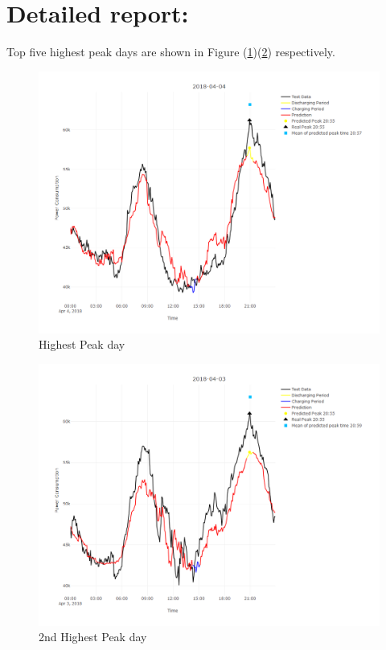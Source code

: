 \documentclass[
]{article}
\begin{document}
\hypertarget{detailed-report}{%
\section{Detailed report:}\label{detailed-report}}

Top five highest peak days are shown in Figure
(\ref{fig:day1})(\ref{fig:day2}) respectively.

\begin{figure}
\includegraphics[width=1\linewidth]{day1} \caption{Highest Peak day\label{day1}}\label{fig:day1}
\end{figure}
\begin{figure}
\includegraphics[width=1\linewidth]{day2} \caption{2nd Highest Peak day\label{day2}}\label{fig:day2}
\end{figure}
\end{document}
